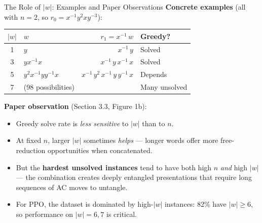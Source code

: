 \documentclass[aspectratio=169,11pt]{beamer}
\newcommand{\inv}[1]{#1^{-1}}
\begin{document}
\begin{frame}{The Role of $|w|$: Examples and Paper Observations}
  \small
  \textbf{Concrete examples} (all with $n = 2$, so $r_0 = \inv{x} y^2 x y^{-3}$):
  \begin{center}
  \begin{tabular}{clrl}
    \toprule
    $|w|$ & $w$ & $r_1 = \inv{x}\, w$ & \textbf{Greedy?} \\
    \midrule
    1 & $y$ & $\inv{x}\, y$ & \textcolor{good}{Solved} \\
    3 & $y \inv{x} x$ & $\inv{x}\, y\, \inv{x}\, x$ & \textcolor{good}{Solved} \\
    5 & $y^2 \inv{x} y \inv{y} x$ & $\inv{x}\, y^2\, \inv{x}\, y\, \inv{y}\, x$ & Depends \\
    7 & (98 possibilities) & & Many \textcolor{bad}{unsolved} \\
    \bottomrule
  \end{tabular}
  \end{center}

  \medskip
  \textbf{Paper observation} (Section 3.3, Figure 1b):
  \begin{itemize}\setlength\itemsep{2pt}
    \item Greedy solve rate is \emph{less sensitive} to $|w|$ than to $n$.
    \item At fixed $n$, larger $|w|$ sometimes \emph{helps} --- longer words
      offer more free-reduction opportunities when concatenated.
    \item But the \textbf{hardest unsolved instances} tend to have both high $n$
      \emph{and} high $|w|$ --- the combination creates deeply entangled presentations
      that require long sequences of AC moves to untangle.
    \item For PPO, the dataset is dominated by high-$|w|$ instances:
      82\% have $|w| \ge 6$, so performance on $|w| = 6, 7$ is critical.
  \end{itemize}
\end{frame}
\end{document}
